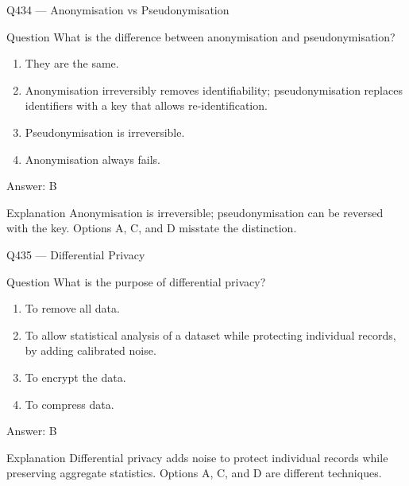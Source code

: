 \documentclass[aspectratio=169,8pt]{beamer}
\begin{document}
	\begin{frame}{Q434 --- Anonymisation vs Pseudonymisation}
		\begin{block}{Question}
			What is the difference between anonymisation and pseudonymisation?
			\begin{enumerate}
				\item They are the same.
				\item Anonymisation irreversibly removes identifiability; pseudonymisation replaces identifiers with a key that allows re-identification.
				\item Pseudonymisation is irreversible.
				\item Anonymisation always fails.
			\end{enumerate}
		\end{block}
		\begin{exampleblock}{Answer: B}\end{exampleblock}
		\begin{block}{Explanation}
			Anonymisation is irreversible; pseudonymisation can be reversed with the key. Options A, C, and D misstate the distinction.
		\end{block}
	\end{frame}
	
	\begin{frame}{Q435 --- Differential Privacy}
		\begin{block}{Question}
			What is the purpose of differential privacy?
			\begin{enumerate}
				\item To remove all data.
				\item To allow statistical analysis of a dataset while protecting individual records, by adding calibrated noise.
				\item To encrypt the data.
				\item To compress data.
			\end{enumerate}
		\end{block}
		\begin{exampleblock}{Answer: B}\end{exampleblock}
		\begin{block}{Explanation}
			Differential privacy adds noise to protect individual records while preserving aggregate statistics. Options A, C, and D are different techniques.
		\end{block}
	\end{frame}
	
\end{document}
